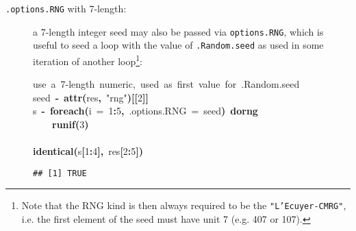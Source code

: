 \documentclass[a4paper,12pt]{article}\usepackage{graphicx, color}
\makeatletter
\newcommand{\hlnumber}[1]{\textcolor[rgb]{0,0,0}{#1}}%
\newcommand{\hlfunctioncall}[1]{\textcolor[rgb]{0.501960784313725,0,0.329411764705882}{\textbf{#1}}}%
\newcommand{\hlstring}[1]{\textcolor[rgb]{0.6,0.6,1}{#1}}%
\newcommand{\hlkeyword}[1]{\textcolor[rgb]{0,0,0}{\textbf{#1}}}%
\newcommand{\hlargument}[1]{\textcolor[rgb]{0.690196078431373,0.250980392156863,0.0196078431372549}{#1}}%
\newcommand{\hlcomment}[1]{\textcolor[rgb]{0.180392156862745,0.6,0.341176470588235}{#1}}%
\newcommand{\hlassignement}[1]{\textcolor[rgb]{0,0,0}{\textbf{#1}}}%
\newcommand{\hlsymbol}[1]{\textcolor[rgb]{0,0,0}{#1}}%
\newcommand{\hlstd}[1]{\textcolor[rgb]{0,0,0}{#1}}%
\newenvironment{kframe}{%
 \def\FrameCommand##1{\hskip\@totalleftmargin \hskip-\fboxsep
 \colorbox{shadecolor}{##1}\hskip-\fboxsep
     \hskip-\linewidth \hskip-\@totalleftmargin \hskip\columnwidth}%
 \MakeFramed {\advance\hsize-\width
   \@totalleftmargin\z@ \linewidth\hsize
   \@setminipage}}%
 {\par\unskip\endMakeFramed}
\newenvironment{knitrout}{}{} %
\renewenvironment{knitrout}{\begin{footnotesize}}{\end{footnotesize}}
\let\code=\texttt
\makeatother
\begin{document}
\begin{description}
\item[\code{.options.RNG} with 7-length:] a 7-length integer seed may also be
passed via \code{options.RNG}, which is useful to seed a loop with the value of
\code{.Random.seed} as used in some iteration of another loop\footnote{Note that
the RNG kind is then always required to be the \code{"L'Ecuyer-CMRG"}, i.e.
the first element of the seed must have unit 7 (e.g. 407 or 107).}:
\begin{knitrout}
\color{fgcolor}\begin{kframe}
\begin{flushleft}
\ttfamily\noindent
\hlcomment{\usebox{\hlnormalsizeboxhash}{\ }use{\ }a{\ }7-length{\ }numeric,{\ }used{\ }as{\ }first{\ }value{\ }for{\ }.Random.seed}\hspace*{\fill}\\
\hlstd{}\hlsymbol{seed}{\ }\hlassignement{\usebox{\hlnormalsizeboxlessthan}-}{\ }\hlfunctioncall{attr}\hlkeyword{(}\hlsymbol{res}\hlkeyword{,}{\ }\hlstring{"{}rng"{}}\hlkeyword{)}\hlkeyword{[[}\hlnumber{2}\hlkeyword{]}\hlkeyword{]}\hspace*{\fill}\\
\hlstd{}\hlsymbol{s}{\ }\hlassignement{\usebox{\hlnormalsizeboxlessthan}-}{\ }\hlfunctioncall{foreach}\hlkeyword{(}\hlargument{i}{\ }\hlargument{=}{\ }\hlnumber{1}\hlkeyword{:}\hlnumber{5}\hlkeyword{,}{\ }\hlargument{.options.RNG}{\ }\hlargument{=}{\ }\hlsymbol{seed}\hlkeyword{)}{\ }\hlkeyword{\usebox{\hlnormalsizeboxpercent}dorng\usebox{\hlnormalsizeboxpercent}}{\ }\hlkeyword{\usebox{\hlnormalsizeboxopenbrace}}\hspace*{\fill}\\
\hlstd{}{\ }{\ }{\ }{\ }\hlfunctioncall{runif}\hlkeyword{(}\hlnumber{3}\hlkeyword{)}\hspace*{\fill}\\
\hlstd{}\hlkeyword{\usebox{\hlnormalsizeboxclosebrace}}\hspace*{\fill}\\
\hlstd{}\hlfunctioncall{identical}\hlkeyword{(}\hlsymbol{s}\hlkeyword{[}\hlnumber{1}\hlkeyword{:}\hlnumber{4}\hlkeyword{]}\hlkeyword{,}{\ }\hlsymbol{res}\hlkeyword{[}\hlnumber{2}\hlkeyword{:}\hlnumber{5}\hlkeyword{]}\hlkeyword{)}\mbox{}
\normalfont
\end{flushleft}
\begin{verbatim}
## [1] TRUE
\end{verbatim}
\end{kframe}
\end{knitrout}


\end{description}
\end{document}
